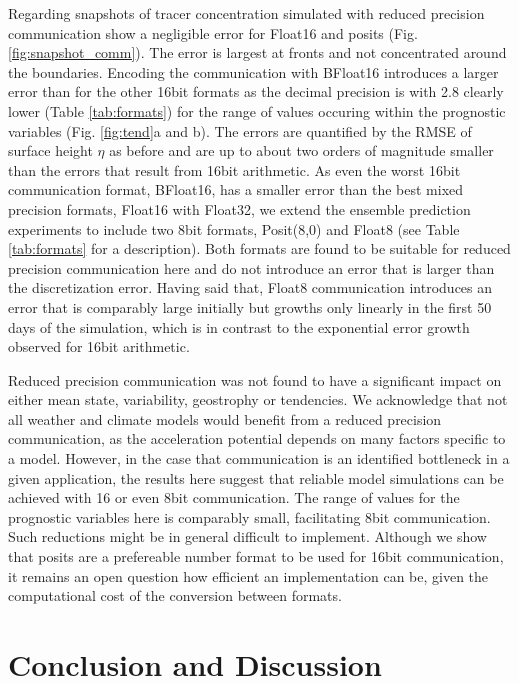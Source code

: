 \documentclass[draft]{agujournal2019}
\begin{document}
Regarding snapshots of tracer concentration simulated with reduced precision communication show a negligible error for Float16 and posits (Fig. \ref{fig:snapshot_comm}). The error is largest at fronts and not concentrated around the boundaries. Encoding the communication with BFloat16 introduces a larger error than for the other 16bit formats as the decimal precision is with 2.8 clearly lower (Table \ref{tab:formats}) for the range of values occuring within the prognostic variables (Fig. \ref{fig:tend}a and b). The errors are quantified by the RMSE of surface height $\eta$ as before and are up to about two orders of magnitude smaller than the errors that result from 16bit arithmetic. As even the worst 16bit communication format, BFloat16, has a smaller error than the best mixed precision formats, Float16 with Float32, we extend the ensemble prediction experiments to include two 8bit formats, Posit(8,0) and Float8 (see Table \ref{tab:formats} for a description). Both formats are found to be suitable for reduced precision communication here and do not introduce an error that is larger than the discretization error. Having said that, Float8 communication introduces an error that is comparably large initially but growths only linearly in the first 50 days of the simulation, which is in contrast to the exponential error growth observed for 16bit arithmetic.

Reduced precision communication was not found to have a significant impact on either mean state, variability, geostrophy or tendencies. We acknowledge that not all weather and climate models would benefit from a reduced precision communication, as the acceleration potential depends on many factors specific to a model. However, in the case that communication is an identified bottleneck in a given application, the results here suggest that reliable model simulations can be achieved with 16 or even 8bit communication. The range of values for the prognostic variables here is comparably small, facilitating 8bit communication. Such reductions might be in general difficult to implement. Although we show that posits are a prefereable number format to be used for 16bit communication, it remains an open question how efficient an implementation can be, given the computational cost of the conversion between formats.

\section{Conclusion and Discussion}
\label{sec:discuss}
\end{document}

